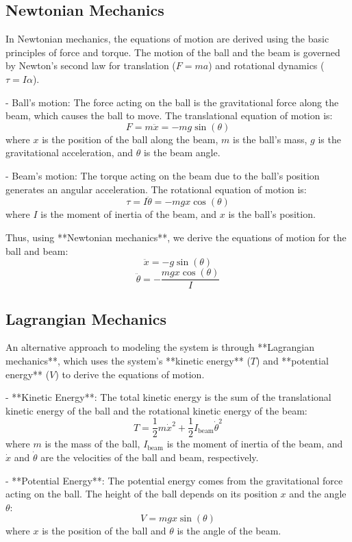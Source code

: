 \documentclass[conference]{IEEEtran}
\begin{document}
\subsection{Newtonian Mechanics}
In Newtonian mechanics, the equations of motion are derived using the basic principles of force and torque. The motion of the ball and the beam is governed by Newton's second law for translation (\(F = ma\)) and rotational dynamics (\(\tau = I \alpha\)).

- Ball's motion: The force acting on the ball is the gravitational force along the beam, which causes the ball to move. The translational equation of motion is:
  \[
  F = m \ddot{x} = - m g \sin(\theta)
  \]
  where \(x\) is the position of the ball along the beam, \(m\) is the ball's mass, \(g\) is the gravitational acceleration, and \(\theta\) is the beam angle.

- Beam's motion: The torque acting on the beam due to the ball's position generates an angular acceleration. The rotational equation of motion is:
  \[
  \tau = I \ddot{\theta} = - m g x \cos(\theta)
  \]
  where \(I\) is the moment of inertia of the beam, and \(x\) is the ball's position.

Thus, using **Newtonian mechanics**, we derive the equations of motion for the ball and beam:
\[
\ddot{x} = - g \sin(\theta)
\]
\[
\ddot{\theta} = - \frac{m g x \cos(\theta)}{I}
\]

\subsection{Lagrangian Mechanics}
An alternative approach to modeling the system is through **Lagrangian mechanics**, which uses the system's **kinetic energy** (\(T\)) and **potential energy** (\(V\)) to derive the equations of motion.

- **Kinetic Energy**: The total kinetic energy is the sum of the translational kinetic energy of the ball and the rotational kinetic energy of the beam:
  \[
  T = \frac{1}{2} m \dot{x}^2 + \frac{1}{2} I_{\text{beam}} \dot{\theta}^2
  \]
  where \(m\) is the mass of the ball, \(I_{\text{beam}}\) is the moment of inertia of the beam, and \(\dot{x}\) and \(\dot{\theta}\) are the velocities of the ball and beam, respectively.

- **Potential Energy**: The potential energy comes from the gravitational force acting on the ball. The height of the ball depends on its position \(x\) and the angle \(\theta\):
  \[
  V = m g x \sin(\theta)
  \]
  where \(x\) is the position of the ball and \(\theta\) is the angle of the beam.
\end{document}

